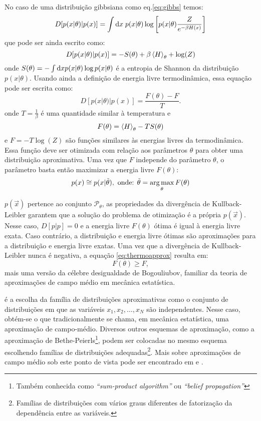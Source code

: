 No caso de uma distribuição gibbsiana como eq.\eqref{eq:gibbs} temos:
\begin{equation*}
 D[ p(x|\theta)|p(x) ] = \int \mathrm{d} x\; p(x|\theta) \log\left[p(x|\theta)\frac{Z}{e^{-\beta H(x)}}\right]
\end{equation*}
que pode ser ainda escrito como:
\[
 D[ p(x|\theta)|p(x) ] = - S(\theta)  + \beta \left\langle H \right\rangle_{\theta}  + \log(Z)
\]
onde $S(\theta) = - \int \mathrm{d} x p(x|\theta) \log p(x|\theta)$ é a entropia de Shannon da distribuição $p(x|\theta)$. Usando ainda a definição de energia livre termodinâmica, essa equação pode ser escrita como:
\begin{equation}
\label{eq:thermoapprox}
 D[ p(x|\theta)|p(x) ] = \dfrac{F(\theta) - F}{T}.
\end{equation}
onde $T = \frac{1}{\beta}$ é uma quantidade similar à temperatura e 
\begin{equation}
\label{eq:freenergy}
F(\theta) = \avg{H}_{\theta} - T S(\theta) 
\end{equation}
e $F = -T\log(Z)$ são funções similares às energias livres da termodinâmica. Essa função deve ser otimizada com relação aos parâmetros $\theta$ para obter uma distribuição aproximativa. Uma vez que $F$ independe do parâmetro $\theta$, o parâmetro basta então maximizar a energia livre $F(\theta)$:
\begin{equation}
p(x) \cong p(x | \tilde{\theta}), \text{   onde: } \tilde{\theta} = \operatorname*{arg\,max}_{\theta} F(\theta)
\end{equation}

 $p(\vec{x})$ pertence ao conjunto $\mathcal{P}_\theta$, as propriedades da divergência de Kullback-Leibler garantem que a solução do problema de otimização é a própria $p(\vec{x})$. Nesse caso, $D[p|p] = 0$ e a energia livre $F(\theta)$ ótima é igual à energia livre exata. Caso contrário, a distribuição e energia livre ótimas são aproximações para a distribuição e energia livre exatas. Uma vez que a divergência de Kullback-Leibler nunca é negativa, a equação \eqref{eq:thermoapprox} resulta em:
\begin{equation}
 \label{eq:bogouliubov}
  F(\theta) \ge F,
\end{equation}
mais uma versão da célebre desigualdade de Bogouliubov, familiar da teoria de aproximações de campo médio em mecânica estatística\cite{Salinas1997}.

 é a escolha da família de distribuições aproximativas como o conjunto de distribuições em que as variáveis $x_1, x_2, \ldots, x_N$ são independentes. Nesse caso, obtém-se o que tradicionalmente se chama, em mecânica estatística, uma aproximação de campo-médio. Diversos outros esquemas de aproximação, como a aproximação de Bethe-Peierls\footnote{Também conhecida como \emph{``sum-product algorithm''} ou \emph{``belief propagation''}}, podem ser colocadas no mesmo esquema escolhendo famílias de distribuições adequadas\footnote{Famílias de distribuições com vários graus diferentes de fatorização da dependência entre as variáveis.}. Mais sobre aproximações de campo médio sob este ponto de vista pode ser encontrado em \citet{Opper2001}\cite{Opper2001} e \citet{Mezard2009}\cite{Mezard2009}.

